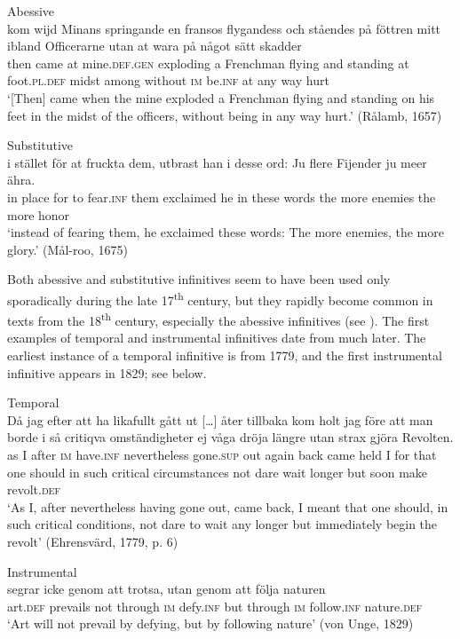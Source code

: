 \documentclass[output=paper]{langscibook}
\begin{document}
\ea
\label{ex:kalm:12}
\ea Abessive\\\label{ex:kalm:12a}
\gll[Då] kom wijd Minans springande en fransos flygandess och ståendes på föttren       mitt ibland Officerarne utan at wara på något sätt skadder\\
then came at mine.\textsc{def.gen} exploding a Frenchman flying and standing at foot.\textsc{pl.def} midst among without \textsc{im} be.\textsc{inf} at any way hurt \\ 
\glt ‘[Then] came when the mine exploded a Frenchman flying and standing on his feet in the midst of the officers, without being in any way hurt.’ (Rålamb, 1657)

\ex Substitutive\\\label{ex:kalm:12b}
\gll i stället för at fruckta dem, utbrast han i desse ord: Ju flere Fijender ju meer ähra.\\
 in place for to fear.\textsc{inf} them exclaimed he in these words the more enemies the more honor\\
\glt ‘instead of fearing them, he exclaimed these words: The more enemies, the more glory.’ (Mål-roo, 1675)
\z 
\z 


Both abessive and substitutive infinitives seem to have been used only sporadically during the late 17\textsuperscript{th} century, but they rapidly become common in texts from the 18\textsuperscript{th} century, especially the abessive infinitives (see \citealt[129–130]{Kalm2016Satsekvivalenta}). The first examples of temporal and instrumental infinitives date from much later. The earliest instance of a temporal infinitive is from 1779, and the first instrumental infinitive appears in 1829; see  below.  

\ea
\label{ex:kalm:13}
\ea Temporal\label{ex:kalm:13a}\\
\gll Då jag efter att ha likafullt gått {ut […]} åter tillbaka kom holt jag före att man borde i så critiqva omständigheter ej våga dröja längre utan strax gjöra Revolten.\\
as I after \textsc{im} have.\textsc{inf} nevertheless gone.\textsc{sup} out again back came held I for that one should in such critical circumstances not dare wait longer but soon make revolt.\textsc{def}\\
\glt ‘As I, after nevertheless having gone out, came back, I meant that one should, in such critical conditions, not dare to wait any longer but immediately begin the revolt’ (Ehrensvärd, 1779, p. 6)

\ex Instrumental\label{ex:kalm:13b}\\
 segrar icke genom att trotsa, utan genom att följa naturen\\
art.\textsc{def} prevails not through \textsc{im} defy.\textsc{inf} but through \textsc{im} follow.\textsc{inf} nature.\textsc{def}\\
\glt ‘Art will not prevail by defying, but by following nature’ (von Unge, 1829)
\z 
\z 
\end{document}

